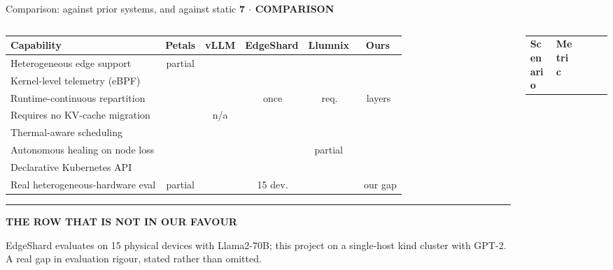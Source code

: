 \documentclass[aspectratio=169,9pt]{beamer}
\newcommand{\kicker}[1]{{\scriptsize\color{keBlue}\bfseries\MakeUppercase{#1}}\par\vspace{0.2em}}
\newcommand{\bad}[1]{{\color{keRed}#1}}
\newcommand{\yes}{{\color{keGreen}\checkmark}}
\newcommand{\no}{{\color{keRed}\texttimes}}
\newenvironment{callout}[2][keBlue]{%
  \begin{beamercolorbox}[wd=\textwidth, sep=6pt, leftskip=4pt]{}%
  \setlength{\fboxrule}{0pt}%
  {\color{#1}\rule{2.5pt}{1.1em}}\hspace{0.5em}%
  {\scriptsize\color{#1}\bfseries\MakeUppercase{#2}}\par\vspace{0.25em}%
  \small
}{\end{beamercolorbox}}
\begin{document}
\begin{frame}[shrink=25]{Comparison: against prior systems, and against static}
  \kicker{7 $\cdot$ Comparison}
  \begin{columns}[T]
    \begin{column}{0.53\textwidth}
      \scriptsize
      \renewcommand{\arraystretch}{1.2}
      \begin{tabular}{@{}lccccc@{}}
        \toprule
        \color{keNavy}\bfseries Capability & \color{keNavy}\bfseries Petals &
        \color{keNavy}\bfseries vLLM & \color{keNavy}\bfseries EdgeShard &
        \color{keNavy}\bfseries Llumnix & \color{keNavy}\bfseries Ours \\
        \midrule
        Heterogeneous edge support      & partial & \no & \yes & \no & \yes \\
        Kernel-level telemetry (eBPF)   & \no & \no & \no & \no & \yes \\
        Runtime-continuous repartition  & \no & \no & \no{\tiny\,once} &
          \yes{\tiny\,req.} & \yes{\tiny\,layers} \\
        Requires no KV-cache migration  & \yes & n/a & \yes & \no & \yes \\
        Thermal-aware scheduling        & \no & \no & \no & \no & \yes \\
        Autonomous healing on node loss & \no & \no & \no & partial & \yes \\
        Declarative Kubernetes API      & \no & \no & \no & \no & \yes \\
        Real heterogeneous-hardware eval & partial & \yes & \yes{\tiny\,15 dev.} &
          \yes & \bad{\no\ our gap} \\
        \bottomrule
      \end{tabular}
      \vspace{0.6em}
      \begin{callout}[keRed]{the row that is not in our favour}
        \scriptsize EdgeShard evaluates on 15 physical devices with Llama2-70B;
        this project on a single-host kind cluster with GPT-2. A real gap in
        evaluation rigour, stated rather than omitted.
      \end{callout}
    \end{column}
    \begin{column}{0.43\textwidth}
      \scriptsize
      \renewcommand{\arraystretch}{1.05}
      \begin{tabular}{@{}llrrr@{}}
        \toprule
        \color{keNavy}\bfseries Scenario & \color{keNavy}\bfseries Metric &

\end{tabular}
\end{column}
\end{columns}
\end{frame}
\end{document}
